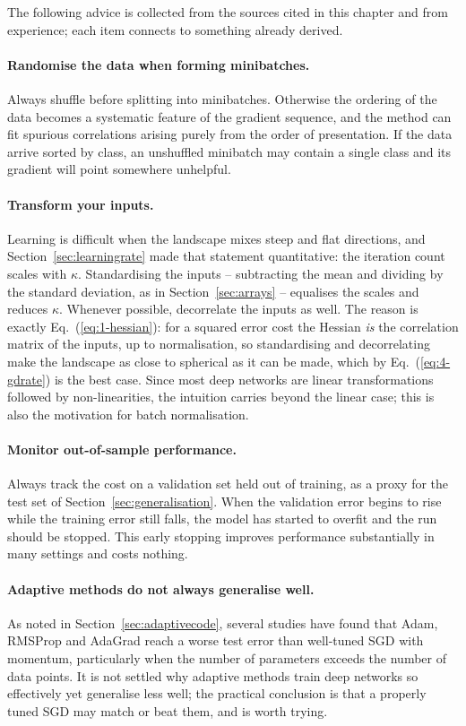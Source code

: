 The following advice is collected from the sources cited in this chapter and
from experience; each item connects to something already derived.

\paragraph{Randomise the data when forming minibatches.}
Always shuffle before splitting into minibatches.  Otherwise the ordering of
the data becomes a systematic feature of the gradient sequence, and the method
can fit spurious correlations arising purely from the order of presentation.
If the data arrive sorted by class, an unshuffled minibatch may contain a
single class and its gradient will point somewhere unhelpful.

\paragraph{Transform your inputs.}
Learning is difficult when the landscape mixes steep and flat directions, and
Section~\ref{sec:learningrate} made that statement quantitative: the iteration
count scales with $\kappa$.  Standardising the inputs -- subtracting the mean
and dividing by the standard deviation, as in Section~\ref{sec:arrays} --
equalises the scales and reduces $\kappa$.  Whenever possible, decorrelate the
inputs as well.  The reason is exactly Eq.~(\ref{eq:1-hessian}): for a squared
error cost the Hessian \emph{is} the correlation matrix of the inputs, up to
normalisation, so standardising and decorrelating make the landscape as close
to spherical as it can be made, which by Eq.~(\ref{eq:4-gdrate}) is the
best case.  Since most deep networks are linear transformations followed by
non-linearities, the intuition carries beyond the linear case; this is also
the motivation for batch normalisation.

\paragraph{Monitor out-of-sample performance.}
Always track the cost on a validation set held out of training, as a proxy for
the test set of Section~\ref{sec:generalisation}.  When the validation error
begins to rise while the training error still falls, the model has started to
overfit and the run should be stopped.  This early stopping improves
performance substantially in many settings and costs nothing.

\paragraph{Adaptive methods do not always generalise well.}
As noted in Section~\ref{sec:adaptivecode}, several studies have found that
Adam, RMSProp and AdaGrad reach a worse test error than well-tuned SGD with
momentum, particularly when the number of parameters exceeds the number of
data points.  It is not settled why adaptive methods train deep networks so
effectively yet generalise less well; the practical conclusion is that a
properly tuned SGD may match or beat them, and is worth trying.

